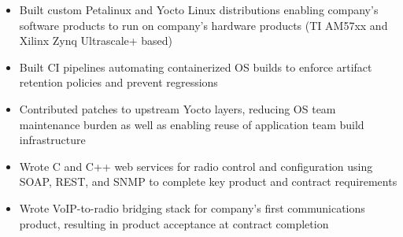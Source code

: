 \begin{itemize}
    \item Built custom Petalinux and Yocto Linux distributions enabling company's software products to run on company's hardware products (TI AM57xx and Xilinx Zynq Ultrascale+ based)
    \item Built CI pipelines automating containerized OS builds to enforce artifact retention policies and prevent regressions
    \item Contributed patches to upstream Yocto layers, reducing OS team maintenance burden as well as enabling reuse of application team build infrastructure
    \item Wrote C and C++ web services for radio control and configuration using SOAP, REST, and SNMP to complete key product and contract requirements
    \item Wrote VoIP-to-radio bridging stack for company's first communications product, resulting in product acceptance at contract completion
\end{itemize}
